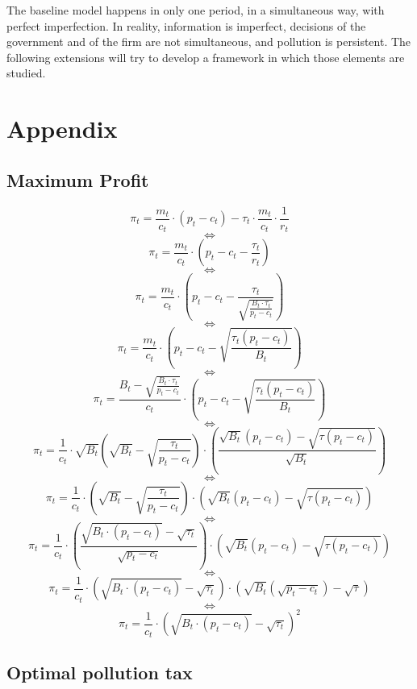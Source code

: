\documentclass{article}
\begin{document}
The baseline model happens in only one period, in a simultaneous way, with perfect imperfection. In reality, information is imperfect, decisions of the government and of the firm are not simultaneous, and pollution is persistent. The following extensions will try to develop a framework in which those elements are studied.

\pagebreak
\section{Appendix}

\subsection{Maximum Profit}
\label{sec:proof1}
$$\pi_{t}= \frac{m_{t}}{c_{t}}\cdot\left(p_{t}-c_{t}\right)-\tau_{t}\cdot \frac{m_{t}}{c_{t}}\cdot \frac{1}{r_{t}}$$
$$\iff$$
$$\pi_{t}=\frac{m_{t}}{c_{t}}\cdot\left(p_{t}-c_{t}-\frac{\tau_{t}}{r_{t}}\right)$$
$$\iff$$
$$\pi_{t}=\frac{m_{t}}{c_{t}}\cdot\left(p_{t}-c_{t}-\frac{\tau_{t}}{\sqrt{\frac{B_{t}\cdot \tau_{t}}{p_{t}-c_{t}}}}\right)$$
$$\iff$$
$$\pi_{t}=\frac{m_{t}}{c_{t}}\cdot\left(p_{t}-c_{t}-\sqrt{\frac{\tau_{t}(p_{t}-c_{t})}{B_{t}}}\right)$$
$$\iff$$
$$\pi_{t}=\frac{B_{t}-\sqrt{\frac{B_{t}\cdot \tau_{t}}{p_{t}-c_{t}}}}{c_{t}}\cdot\left(p_{t}-c_{t}-\sqrt{\frac{\tau_{t}(p_{t}-c_{t})}{B_{t}}}\right)$$
$$\iff$$
$$\pi_{t}=\frac{1}{c_{t}}\cdot\sqrt{B_{t}}\left(\sqrt{B_{t}}-\sqrt{\frac{\tau_{t}}{p_{t}-c_{t}}}\right)\cdot\left(\frac{\sqrt{B_{t}}(p_{t}-c_{t})-\sqrt{\tau(p_{t}-c_{t})}}{\sqrt{B_{t}}}\right)$$
$$\iff$$
$$\pi_{t}=\frac{1}{c_{t}}\cdot\left(\sqrt{B_{t}}-\sqrt{\frac{\tau_{t}}{p_{t}-c_{t}}}\right)\cdot\left(\sqrt{B_{t}}(p_{t}-c_{t})-\sqrt{\tau(p_{t}-c_{t})}\right)$$
$$\iff$$
$$\pi_{t}=\frac{1}{c_{t}}\cdot\left(\frac{\sqrt{B_{t}\cdot (p_{t}-c_{t})}-\sqrt{\tau_{t}}}{\sqrt{p_{t}-c_{t}}}\right)\cdot\left(\sqrt{B_{t}}(p_{t}-c_{t})-\sqrt{\tau(p_{t}-c_{t})}\right)$$
$$\iff$$
$$\pi_{t}=\frac{1}{c_{t}}\cdot\left({\sqrt{B_{t}\cdot (p_{t}-c_{t})}-\sqrt{\tau_{t}}}\right)\cdot\left(\sqrt{B_{t}}(\sqrt{p_{t}-c_{t}})-\sqrt{\tau}\right)$$
$$\iff$$
\begin{equation}\tag{6}
    \pi_{t}=\frac{1}{c_{t}}\cdot\left({\sqrt{B_{t}\cdot (p_{t}-c_{t})}-\sqrt{\tau_{t}}}\right)^{2}
\end{equation}

\subsection{Optimal pollution tax}
\label{sec:proof2}
\end{document}
